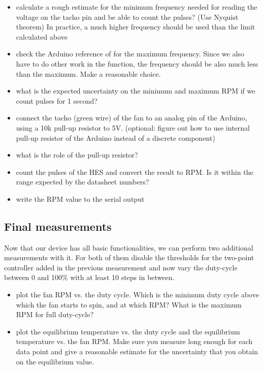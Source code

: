 \begin{itemize}
	\item calculate a rough estimate for the minimum frequency needed for reading the voltage on the tacho pin and be able to count the pulses? (Use Nyquist theorem) In practice, a much higher frequency should be used than the limit calculated above
	\item check the Arduino reference of  for the maximum frequency. Since we also have to do other work in the  function, the frequency should be also much less than the maximum. Make a reasonable choice.
    \item what is the expected uncertainty on the minimum and maximum RPM if we count pulses for 1 second?
	\item connect the tacho (green wire) of the fan to an analog pin of the Arduino, using a 10k pull-up resistor to 5V. (optional: figure out how to use internal pull-up resistor of the Arduino instead of a discrete component)
	\item what is the role of the pull-up resistor?
	\item count the pulses of the HES and convert the result to RPM. Is it within the range expected by the datasheet numbers?
	\item write the \ac{RPM} value to the serial output
\end{itemize}

\subsection{Final measurements}
Now that our device has all basic functionalities, we can perform two additional measurements with it. For both of them disable the thresholds for the two-point controller added in the previous measurement and now vary the duty-cycle between 0 and 100\% with at least 10 steps in between.
\begin{itemize}
	\item plot the fan RPM vs. the duty cycle. Which is the minimum duty cycle above which the fan starts to spin, and at which RPM? What is the maximum RPM for full duty-cycle?
	\item plot the equilibrium temperature vs. the duty cycle and the equilibrium temperature vs. the fan RPM. Make sure you measure long enough for each data point and give a reasonable estimate for the uncertainty that you obtain on the equilibrium value.
\end{itemize}

